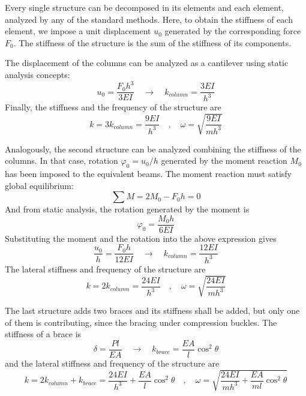 \documentclass{problems}
\begin{document}
Every single structure can be decomposed in its elements and each element, analyzed by any of the standard methods. Here, to obtain the stiffness of each element, we impose a unit displacement $u_0$ generated by the corresponding force $F_0$. The stiffness of the structure is the sum of the stiffness of its components.

\begin{center}
\end{center}

The displacement of the columns can be analyzed as a cantilever using static analysis concepts:
$$
u_0 = \frac{F_0h^3}{3EI} \quad \rightarrow \quad k_{column} = \frac{3EI}{h^3}
$$
Finally, the stiffness and the frequency of the structure are
$$
k = 3k_{column} = \frac{9EI}{h^3} \quad , \quad \omega = \sqrt{\frac{9EI}{mh^3}}
$$

\begin{center}
\end{center}

Analogously, the second structure can be analyzed combining the stiffness of the columns. In that case, rotation $\varphi_0 = u_0/h$ generated by the moment reaction $M_0$ has been imposed to the equivalent beams. The moment reaction must satisfy global equilibrium:
$$
\sum M = 2M_0 -F_0h = 0
$$
And from static analysis, the rotation generated by the moment is
$$
\varphi_0 = \frac{M_0h}{6EI}
$$
Substituting the moment and the rotation into the above expression gives
$$
\frac{u_0}{h} = \frac{F_0h}{12EI} \quad \rightarrow \quad k_{column} = \frac{12EI}{h^3}
$$
The lateral stiffness and frequency of the structure are
$$
k = 2k_{column} = \frac{24EI}{h^3} \quad , \quad \omega = \sqrt{\frac{24EI}{mh^3}}
$$

\begin{center}
\end{center}

The last structure adds two braces and its stiffness shall be added, but only one of them is contributing, since the bracing under compression buckles. The stiffness of a brace is
$$
\delta = \frac{Pl}{EA} \quad \rightarrow \quad k_{brace} = \frac{EA}{l}\cos^2\theta
$$
and the lateral stiffness and frequency of the structure are
$$
k = 2k_{column} + k_{brace} = \frac{24EI}{h^3}+\frac{EA}{l}\cos^2\theta \quad , \quad 
\omega = \sqrt{\frac{24EI}{mh^3}+\frac{EA}{ml}\cos^2\theta}
$$
\end{document}
